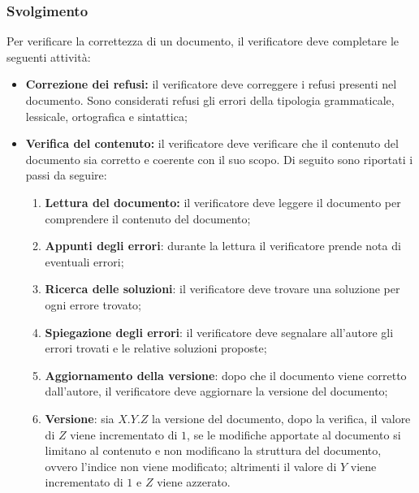 \subsubsection*{Svolgimento}
Per verificare la correttezza di un documento, il verificatore deve completare le seguenti attività:
\begin{itemize}
	\item \textbf{Correzione dei refusi:} il verificatore deve correggere i refusi presenti nel documento. Sono considerati refusi gli errori della tipologia grammaticale, lessicale, ortografica e sintattica;
	\item \textbf{Verifica del contenuto:} il verificatore deve verificare che il contenuto del documento sia corretto e coerente con il suo scopo. 
		Di seguito sono riportati i passi da seguire:
		\begin{enumerate}
			\item \textbf{Lettura del documento:} il verificatore deve leggere il documento per comprendere il contenuto del documento;
			\item \textbf{Appunti degli errori}: durante la lettura il verificatore prende nota di eventuali errori;
			\item \textbf{Ricerca delle soluzioni}: il verificatore deve trovare una soluzione per ogni errore trovato;
			\item \textbf{Spiegazione degli errori}: il verificatore deve segnalare all'autore gli errori trovati e le relative  soluzioni proposte;
			\item \textbf{Aggiornamento della versione}: dopo che il documento viene corretto dall'autore, il verificatore deve aggiornare la versione del documento;
			\item \textbf{Versione}: sia $X.Y.Z$ la versione del documento, dopo la verifica, il valore di $Z$ viene incrementato di $1$, se le modifiche apportate al documento si limitano al contenuto e non modificano la struttura del documento, ovvero l'indice non viene modificato; altrimenti il valore di $Y$ viene incrementato di $1$ e $Z$ viene azzerato.
		\end{enumerate}
\end{itemize}